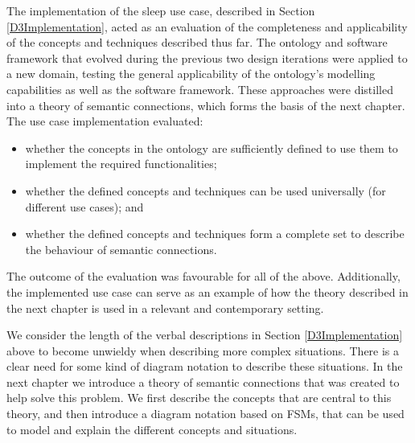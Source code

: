 The implementation of the sleep use case, described in Section \ref{D3Implementation}, acted as an evaluation of the completeness and applicability of the concepts and techniques described thus far. The ontology and software framework that evolved during the previous two design iterations were applied to a new domain, testing the general applicability of the ontology's modelling capabilities as well as the software framework. These approaches were distilled into a theory of semantic connections, which forms the basis of the next chapter. The use case implementation evaluated: 
\begin{itemize}
	\item whether the concepts in the ontology are sufficiently defined to use them to implement the required functionalities;
	\item whether the defined concepts and techniques can be used universally (for different use cases); and
	\item  whether the defined concepts and techniques form a complete set to describe the behaviour of semantic connections.
\end{itemize}

The outcome of the evaluation was favourable for all of the above. Additionally, the implemented use case can serve as an example of how the theory described in the next chapter is used in a relevant and contemporary setting.

We consider the length of the verbal descriptions in Section \ref{D3Implementation} above to become unwieldy when describing more complex situations. There is a clear need for some kind of diagram notation to describe these situations. In the next chapter we introduce a theory of semantic connections that was created to help solve this problem. We first describe the concepts that are central to this theory, and then introduce a diagram notation based on \acp{FSM}, that can be used to model and explain the different concepts and situations.


